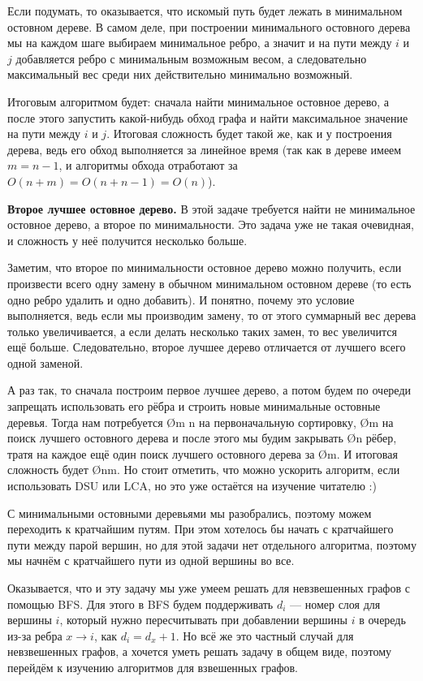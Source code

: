Если подумать, то оказывается, что искомый путь будет лежать в минимальном остовном дереве. В самом деле, при построении минимального остовного дерева мы на каждом шаге выбираем минимальное ребро, а значит и на пути между $i$ и $j$ добавляется ребро с минимальным возможным весом, а следовательно максимальный вес среди них действительно минимально возможный.

Итоговым алгоритмом будет: сначала найти минимальное остовное дерево, а после этого запустить какой-нибудь обход графа и найти максимальное значение на пути между $i$ и $j$. Итоговая сложность будет такой же, как и у построения дерева, ведь его обход выполняется за линейное время (так как в дереве имеем $m = n - 1$, и алгоритмы обхода отработают за $O(n + m) = O(n + n - 1) = O(n)$).

\textbf{Второе лучшее остовное дерево.} В этой задаче требуется найти не минимальное остовное дерево, а второе по минимальности. Это задача уже не такая очевидная, и сложность у неё получится несколько больше.

Заметим, что второе по минимальности остовное дерево можно получить, если произвести всего одну замену в обычном минимальном остовном дереве (то есть одно ребро удалить и одно добавить). И понятно, почему это условие выполняется, ведь если мы производим замену, то от этого суммарный вес дерева только увеличивается, а если делать несколько таких замен, то вес увеличится ещё больше. Следовательно, второе лучшее дерево отличается от лучшего всего одной заменой.

А раз так, то сначала построим первое лучшее дерево, а потом будем по очереди запрещать использовать его рёбра и строить новые минимальные остовные деревья. Тогда нам потребуется \O{m \log n} на первоначальную сортировку, \O{m} на поиск лучшего остовного дерева и после этого мы будим закрывать \O{n} рёбер, тратя на каждое ещё один поиск лучшего остовного дерева за \O{m}. И итоговая сложность будет \O{nm}. Но стоит отметить, что можно ускорить алгоритм, если использовать DSU или LCA, но это уже остаётся на изучение читателю :)


С минимальными остовными деревьями мы разобрались, поэтому можем переходить к кратчайшим путям. При этом хотелось бы начать с кратчайшего пути между парой вершин, но для этой задачи нет отдельного алгоритма, поэтому мы начнём с кратчайшего пути из одной вершины во все.

Оказывается, что и эту задачу мы уже умеем решать для невзвешенных графов с помощью BFS. Для этого в BFS будем поддерживать $d_i$ — номер слоя для вершины $i$, который нужно пересчитывать при добавлении вершины $i$ в очередь из-за ребра $x \to i$, как $d_i = d_x + 1$. Но всё же это частный случай для невзвешенных графов, а хочется уметь решать задачу в общем виде, поэтому перейдём к изучению алгоритмов для взвешенных графов.


